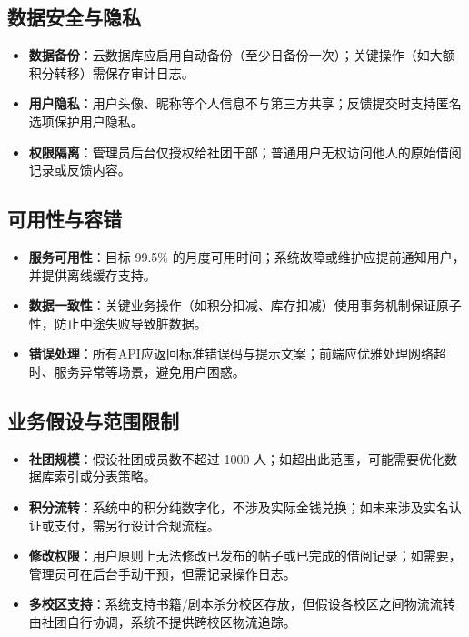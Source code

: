 \documentclass[a4paper,12pt]{article}
\begin{document}
\subsection{数据安全与隐私}
\begin{itemize}
    \item \textbf{数据备份}：云数据库应启用自动备份（至少日备份一次）；关键操作（如大额积分转移）需保存审计日志。
    \item \textbf{用户隐私}：用户头像、昵称等个人信息不与第三方共享；反馈提交时支持匿名选项保护用户隐私。
    \item \textbf{权限隔离}：管理员后台仅授权给社团干部；普通用户无权访问他人的原始借阅记录或反馈内容。
\end{itemize}

\subsection{可用性与容错}
\begin{itemize}
    \item \textbf{服务可用性}：目标 99.5\% 的月度可用时间；系统故障或维护应提前通知用户，并提供离线缓存支持。
    \item \textbf{数据一致性}：关键业务操作（如积分扣减、库存扣减）使用事务机制保证原子性，防止中途失败导致脏数据。
    \item \textbf{错误处理}：所有API应返回标准错误码与提示文案；前端应优雅处理网络超时、服务异常等场景，避免用户困惑。
\end{itemize}

\subsection{业务假设与范围限制}
\begin{itemize}
    \item \textbf{社团规模}：假设社团成员数不超过 1000 人；如超出此范围，可能需要优化数据库索引或分表策略。
    \item \textbf{积分流转}：系统中的积分纯数字化，不涉及实际金钱兑换；如未来涉及实名认证或支付，需另行设计合规流程。
    \item \textbf{修改权限}：用户原则上无法修改已发布的帖子或已完成的借阅记录；如需要，管理员可在后台手动干预，但需记录操作日志。
    \item \textbf{多校区支持}：系统支持书籍/剧本杀分校区存放，但假设各校区之间物流流转由社团自行协调，系统不提供跨校区物流追踪。
\end{itemize}
\end{document}
